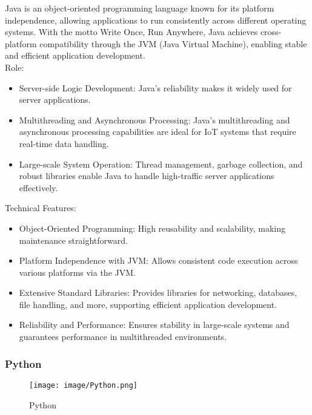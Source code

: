 \documentclass[conference]{IEEEtran}
\begin{document}
\noindent Java is an object-oriented programming language known for its platform independence, allowing applications to run consistently across different operating systems. With the motto Write Once, Run Anywhere, Java achieves cross-platform compatibility through the JVM (Java Virtual Machine), enabling stable and efficient application development. \\

Role:
\begin{itemize}
    \item Server-side Logic Development: Java’s reliability makes it widely used for server applications.\\ 
    \item Multithreading and Asynchronous Processing: Java's multithreading and asynchronous processing capabilities are ideal for IoT systems that require real-time data handling.\\
    \item Large-scale System Operation: Thread management, garbage collection, and robust libraries enable Java to handle high-traffic server applications effectively.\\
\end{itemize}

Technical Features:
\begin{itemize}
    \item Object-Oriented Programming: High reusability and scalability, making maintenance straightforward.\\
    \item Platform Independence with JVM: Allows consistent code execution across various platforms via the JVM.\\
    \item Extensive Standard Libraries: Provides libraries for networking, databases, file handling, and more, supporting efficient application development.\\
    \item Reliability and Performance: Ensures stability in large-scale systems and guarantees performance in multithreaded environments.\\
\end{itemize}



\subsubsection{Python}

\begin{figure}[h!]
    \centering
    \texttt{[image: image/Python.png]}
    \caption{Python}
    \label{fig:enter-label}
\end{figure}
\end{document}
